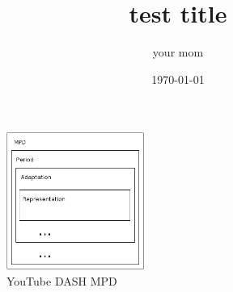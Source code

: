 \documentclass[10pt,journal]{IEEEtran}
\title{test title}
\author{your mom}
\date{\today}
\begin{document}
\maketitle

\begin{abstract}
	\lipsum[1]
\end{abstract}



\begin{figure}
	\centering
	\includegraphics[width=0.4\textwidth]{figures/yt-dash.png}
	\caption{YouTube DASH MPD}
\end{figure}







\end{document}

